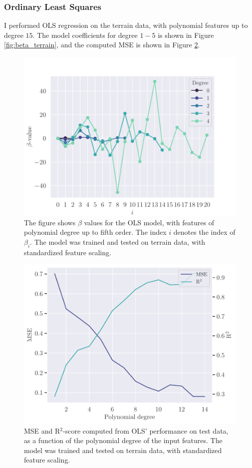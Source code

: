 \subsubsection{Ordinary Least Squares}\label{sssec:ols_terrain}
I performed OLS regression on the terrain data, with polynomial features up to degree $15$. The model coefficients for degree $1-5$ is shown in Figure \ref{fig:beta_terrain}, and the computed MSE is shown in Figure \ref{fig:ols_error_terrain}.
\begin{figure}[h]
    \centering
    \includegraphics[width=\linewidth]{project-1/latex/figures/ols_beta_terrain_D5_N50.pdf}
    \caption{The figure shows $\beta$ values for the OLS model, with features of polynomial degree up to fifth order. The index $i$ denotes the index of $\beta_{i}$. The model was trained and tested on terrain data, with standardized feature scaling.}
    \label{fig:ols_beta_terrain}
\end{figure}
\begin{figure}[h]
    \centering
    \includegraphics[width=\linewidth]{project-1/latex/figures/ols_error_terrain_N50.pdf}
    \caption{MSE and R$^{2}$-score computed from OLS' performance on test data, as a function of the polynomial degree of the input features. The model was trained and tested on terrain data, with standardized feature scaling.}
    \label{fig:ols_error_terrain}
\end{figure}


